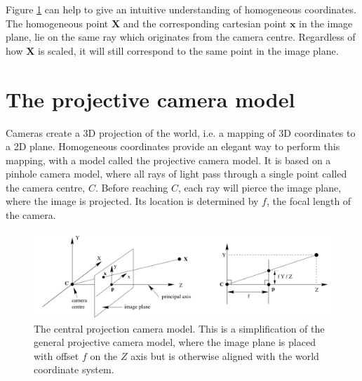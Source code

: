 Figure \ref{fig:central_projection_camera} can help to give an intuitive understanding of homogeneous coordinates.
The homogeneous point $\textbf{X}$ and the corresponding cartesian point $\textbf{x}$ in the image plane, lie on the same ray which originates from the camera centre.
Regardless of how $\textbf{X}$ is scaled, it will still correspond to the same point in the image plane.

\section{The projective camera model}\label{camera-model}
Cameras create a 3D projection of the world, i.e. a mapping of 3D coordinates to a 2D plane.
Homogeneous coordinates provide an elegant way to perform this mapping, with a model called the projective camera model.
It is based on a pinhole camera model, where all rays of light pass through a single point called the camera centre, $C$. Before reaching $C$, each ray will pierce the image plane, where the image is projected.
Its location is determined by $f$, the focal length of the camera.

\begin{figure}
\begin{center}
\includegraphics[width=1.0\textwidth]{figures/central_projection_camera.png}
\end{center}
\caption{The central projection camera model. This is a simplification of the general projective camera model, where the image plane is placed with offset $f$ on the $Z$ axis but is otherwise aligned with the world coordinate system.}
\label{fig:central_projection_camera} %
\end{figure}

